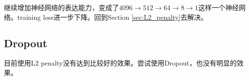 \documentclass{article}
\begin{document}
\begin{CJK}{UTF8}{gbsn}
继续增加神经网络的表达能力，变成了$4096 \rightarrow 512 \rightarrow 64 \rightarrow 8 \rightarrow 1$这样一个神经网络。training loss进一步下降。回到Section \ref{sec:L2_penalty}去解决。

\subsection{Dropout}

目前使用L2 penalty没有达到比较好的效果。尝试使用Dropout，也没有明显的效果。

\end{CJK}
\end{document}
